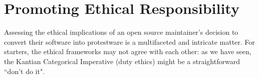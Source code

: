 \documentclass[journal,twocolumn]{IEEEtran}
\begin{document}


\section{Promoting Ethical Responsibility}
\label{sec:guidelines}

Assessing the ethical implications of an open source maintainer's decision to convert their software into protestware is a multifaceted and intricate matter. For starters, the ethical frameworks may not agree with each other: as we have seen, the Kantian Categorical Imperative (duty ethics) might be a straightforward ``don't do it". 
\end{document}

